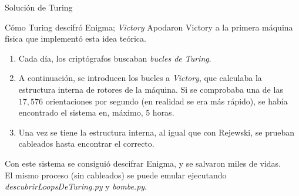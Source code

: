 \documentclass[aspectratio=169]{beamer}
\begin{document}
\begin{frame}{Solución de Turing}
	\begin{block}{Cómo Turing descifró Enigma; \textit{Victory}}
		Apodaron Victory a la primera máquina física que implementó esta idea teórica.
		\begin{enumerate}
			\item Cada día, los criptógrafos buscaban \textit{bucles de Turing}. \pause
			\item A continuación, se introducen los bucles a \textit{Victory}, que calculaba la estructura interna de rotores de la máquina. Si se comprobaba una de las $17,576$ orientaciones por segundo (en realidad se era más rápido), se había encontrado el sistema en, máximo, 5 horas. \pause
			\item Una vez se tiene la estructura interna, al igual que con Rejewski, se prueban cableados hasta encontrar el correcto. \pause
		\end{enumerate}
	\end{block} \pause
	Con este sistema se consiguió descifrar Enigma, y se salvaron miles de vidas.\\
	El mismo proceso (sin cableados) se puede emular ejecutando \textit{descubrirLoopsDeTuring.py} y \textit{bombe.py}.
\end{frame}
\end{document}
